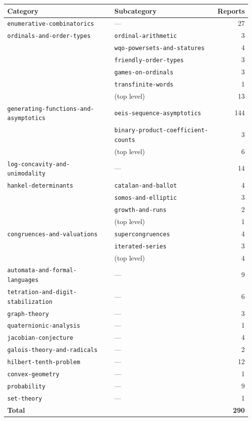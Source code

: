 \documentclass[11pt]{article}
\newcommand{\dir}[1]{\texttt{#1}}
\begin{document}
\begin{center}
\small
\begin{tabular}{@{}llr@{}}
\toprule
\textbf{Category} & \textbf{Subcategory} & \textbf{Reports}\\
\midrule
\dir{enumerative-combinatorics} & --- & 27\\
\midrule
\dir{ordinals-and-order-types} & \dir{ordinal-arithmetic} & 3\\
 & \dir{wqo-powersets-and-statures} & 4\\
 & \dir{friendly-order-types} & 3\\
 & \dir{games-on-ordinals} & 3\\
 & \dir{transfinite-words} & 1\\
 & (top level) & 13\\
\midrule
\dir{generating-functions-and-asymptotics} & \dir{oeis-sequence-asymptotics} & 144\\
 & \dir{binary-product-coefficient-counts} & 3\\
 & (top level) & 6\\
\midrule
\dir{log-concavity-and-unimodality} & --- & 14\\
\midrule
\dir{hankel-determinants} & \dir{catalan-and-ballot} & 4\\
 & \dir{somos-and-elliptic} & 3\\
 & \dir{growth-and-runs} & 2\\
 & (top level) & 1\\
\midrule
\dir{congruences-and-valuations} & \dir{supercongruences} & 4\\
 & \dir{iterated-series} & 3\\
 & (top level) & 4\\
\midrule
\dir{automata-and-formal-languages} & --- & 9\\
\midrule
\dir{tetration-and-digit-stabilization} & --- & 6\\
\midrule
\dir{graph-theory} & --- & 3\\
\midrule
\dir{quaternionic-analysis} & --- & 1\\
\midrule
\dir{jacobian-conjecture} & --- & 4\\
\midrule
\dir{galois-theory-and-radicals} & --- & 2\\
\midrule
\dir{hilbert-tenth-problem} & --- & 12\\
\midrule
\dir{convex-geometry} & --- & 1\\
\midrule
\dir{probability} & --- & 9\\
\midrule
\dir{set-theory} & --- & 1\\
\midrule
\multicolumn{2}{l}{\textbf{Total}} & \textbf{290}\\
\bottomrule
\end{tabular}
\end{center}
\end{document}
